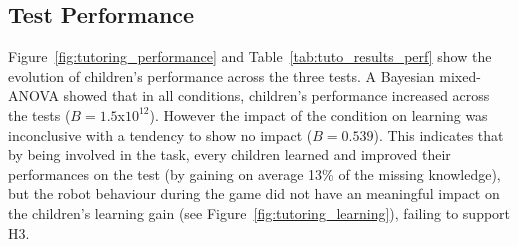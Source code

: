 %


\subsection{Test Performance}

Figure~\ref{fig:tutoring_performance} and Table~\ref{tab:tuto_results_perf} show the evolution of children's performance across the three tests. A Bayesian mixed-ANOVA showed that in all conditions, children's performance increased across the tests ($B=1.5$x$10^{12}$). However the impact of the condition on learning was inconclusive with a tendency to show no impact ($B=0.539$). This indicates that by being involved in the task, every children learned and improved their performances on the test (by gaining on average 13\% of the missing knowledge), but the robot behaviour during the game did not have an meaningful impact on the children's learning gain (see Figure~\ref{fig:tutoring_learning}), failing to support H3. %

